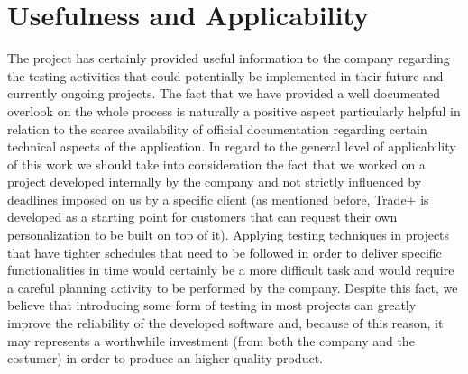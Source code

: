 \section{Usefulness and Applicability} 

The project has certainly provided useful information to the company regarding the testing activities that could potentially be implemented in their future and currently ongoing projects. The fact that we have provided a well documented overlook on the whole process is naturally a positive aspect particularly helpful in relation to the scarce availability of official documentation regarding certain technical aspects of the application. 
In regard to the general level of applicability of this work we should take into consideration the fact that we worked on a project developed internally by the company and not strictly influenced by deadlines imposed on us by a specific client (as mentioned before, Trade+ is developed as a starting point for customers that can request their own personalization to be built on top of it). Applying testing techniques in projects that have tighter schedules that need to be followed in order to deliver specific functionalities in time would certainly be a more difficult task and would require a careful planning activity to be performed by the company. Despite this fact, we believe that introducing some form of testing in most projects can greatly improve the reliability of the developed software and, because of this reason, it may represents a worthwhile investment (from both the company and the costumer) in order to produce an higher quality product.